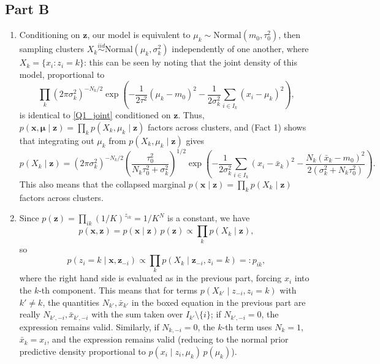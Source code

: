 \documentclass[12pt]{article}
\newcommand{\iid}{\overset{iid}{\sim}}
\begin{document}
\subsection*{Part B}
\begin{enumerate}[label=(\alph*), resume]
    \item Conditioning on $\bm{z}$, our model is equivalent to $\mu_k \sim
    \text{Normal}(m_0, \tau_0^2)$, then sampling clusters $X_k \iid
    \text{Normal}(\mu_k, \sigma_k^2)$ independently of one another, where $X_k
    = \{x_i: z_i = k\}$: this can be seen by noting that the joint density of
    this model, proportional to \[
        \prod_k (2\pi\sigma_k^2)^{-N_k/2}\exp\left(-\frac{1}{2\tau^2}(\mu_k - m_0)^2 - \frac{1}{2\sigma_k^2}\sum_{i \in I_k} (x_i - \mu_k)^2\right),
    \] is identical to \eqref{Q1_joint} conditioned on $\bm{z}$.
    Thus, $p(\bm{x}, \bm{\mu} \mid \bm{z}) = \prod_k p(X_k, \mu_k \mid \bm{z})$
    factors across clusters, and (Fact 1) shows that integrating out
    $\mu_k$ from $p(X_k, \mu_k \mid \bm{z})$ gives \[
        \boxed{p(X_k \mid \bm{z})
            = (2\pi\sigma_k^2)^{-N_k /2} \left(\frac{\tau_0^2}{N_k\tau_0^2 + \sigma_k^2}\right)^{1 /2}
            \exp\left(-\frac{1}{2\sigma_k^2}\sum_{i \in I_k}(x_i - \bar{x}_k)^2 - \frac{N_k(\bar{x}_k - m_0)^2}{2(\sigma_k^2 + N_k \tau_0^2)}\right).}
    \] This also means that the collapsed marginal $p(\bm{x} \mid \bm{z}) =
    \prod_k p(X_k \mid \bm{z})$ factors across clusters.


    \item Since $p(\bm{z}) = \prod_{ik}(1 /K)^{z_{ik}} = 1 /K^N$ is a constant,
    we have \[
        p(\bm{x}, \bm{z})
            = p(\bm{x} \mid \bm{z})\, p(\bm{z})
            \propto \prod_k p(X_k\mid \bm{z}),
    \] so \[
        p(z_i = k\mid \bm{x}, \bm{z}_{-i})
            \propto \prod_k p(X_k\mid \bm{z}_{-i}, z_i = k) =: p_{ik},
    \] where the right hand side is evaluated as in the previous part, forcing
    $x_i$ into the $k$-th component.
    This means that for terms $p(X_{k'}\mid z_{-i}, z_i = k)$ with $k' \neq k$,
    the quantities $N_{k'}, \bar{x}_{k'}$ in the boxed equation in the previous
    part are really $N_{k', -i}, \bar{x}_{k', -i}$ with the sum taken over
    $I_{k'}\setminus\{i\}$; if $N_{k', -i} = 0$, the expression remains valid.
    Similarly, if $N_{k, -i} = 0$, the $k$-th term uses $N_k = 1$, $\bar{x}_{k}
    = x_i$, and the expression remains valid (reducing to the normal prior
    predictive density proportional to $p(x_i\mid z_i, \mu_k)\, p(\mu_k)$).


\end{enumerate}
\end{document}
